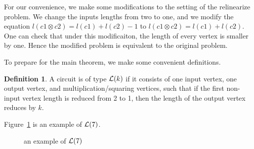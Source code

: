 \documentclass[11pt]{article} %
\theoremstyle{plain}
\theoremstyle{definition}
\newtheorem{definition}{Definition}
\begin{document}
For our convenience, we make some modifications to the setting of the relinearize problem. We change the inputs lengths from two to one, and we modify the equation $l(c1 \otimes c2) = l(c1) + l(c2)-1$ to $l(c1 \otimes c2) = l(c1) + l(c2)$.  One can check that under this modificaiton, the length of every vertex is smaller by one. Hence the modified problem is equivalent to the original problem.



To prepare for the main theorem, we make some convenient definitions.  
\begin{definition}
A circuit is of type $\mathcal{L}(k)$ if it consists of one input vertex, one output vertex, and multiplication/squaring vertices, such that if the first non-input vertex length is reduced from 2 to 1, then the length of the output vertex reduces by $k$.  
\end{definition}

Figure~\ref{fig: L7} is an example of $\mathcal{L}(7)$. 
\begin{figure}[h!]
\begin{center}
\end{center}
\caption{an example of $\mathcal{L}(7)$}
\label{fig: L7}
\end{figure}
\end{document}
